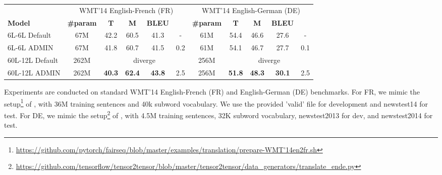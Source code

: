 \documentclass[11pt,a4paper]{article}
\newcommand\DNAME{ADMIN}
\begin{document}
\begin{table*}[h]
    \centering
    \begin{tabular}{|l||c|c|c|c|c|c|c|c|c|c|}
        \toprule
        & \multicolumn{5}{c|}{WMT'14 English-French (FR)} & \multicolumn{5}{c|}{WMT'14 English-German (DE)} \\
        {\bf Model} & {\bf \#param} &{\bf T} &{\bf M} &{\bf BLEU} & {}& {\bf \#param} &{\bf T} &{\bf M} & {\bf BLEU} & {} \\
        \midrule
        
        6L-6L Default & 67M & 42.2 & 60.5 & 41.3 & - & 61M & 54.4 & 46.6 &  27.6 & - \\ \hline
        6L-6L \DNAME & 67M & 41.8 & 60.7 & 41.5 & 0.2 & 61M & 54.1 & 46.7 &  27.7 & 0.1 \\ \hline

        \hline
        60L-12L Default & 262M & \multicolumn{4}{c|}{diverge} & 256M & \multicolumn{4}{c|}{diverge}  \\ \hline
        60L-12L \DNAME & 262M & {\bf 40.3} & {\bf 62.4} & {\bf 43.8} & 2.5 & 256M & {\bf 51.8} & {\bf 48.3} &  {\bf 30.1} & 2.5 \\ \hline


    \end{tabular}
    \caption{Test results on WMT'14 benchmarks, in terms of TER ({\bf T}), METEOR ({\bf M}), and BLEU. {} shows difference in BLEU score against baseline 6L-6L Default. Best results are boldfaced. 60L-12L ADMIN outperforms 6L-6L in all metrics with statistical significance (). Following convention, BLEU is computed by \texttt{multi-bleu.perl} via the standardized tokenization of the publicly-accessible dataset. }
    \label{tab:main_result}
    \vspace{-4mm}
\end{table*}

Experiments are conducted on standard WMT'14 English-French (FR) and English-German (DE) benchmarks. 
For FR, we mimic the setup\footnote{\url{https://github.com/pytorch/fairseq/blob/master/examples/translation/prepare-WMT'14en2fr.sh}} of \cite{ott-etal-2018-scaling}, with 36M training sentences and 40k subword vocabulary.
We use the provided 'valid' file for development and newstest14 for test.
For DE, we mimic the setup\footnote{\url{https://github.com/tensorflow/tensor2tensor/blob/master/tensor2tensor/data_generators/translate_ende.py}} of \cite{so19evolved}, with 4.5M training sentences, 32K subword vocabulary, newstest2013 for dev, and newstest2014 for test.
\end{document}
